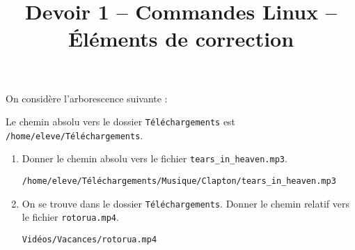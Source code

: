 \documentclass[a4paper,dvipsnames]{article}
\title{Devoir 1 -- Commandes Linux -- Éléments de correction}
\author{}
\date{}
\newenvironment{correction}{\color{blue}}{}
\begin{document}
\renewcommand{\contentsname}{}

\pagestyle{fancy}

\begin{tcolorbox}[colframe=blue!75, colback=blue!45, valign=center, height=1.5cm, top=5mm]
  \maketitle
\end{tcolorbox}


\vspace{1cm}

\thispagestyle{fancy}

\begin{exercice}{}{}
  On considère l'arborescence suivante :

  \bigskip


  \bigskip

  Le chemin absolu vers le dossier \texttt{Téléchargements} est \texttt{/home/eleve/Téléchargements}.

  \begin{enumerate}
    \item Donner le chemin absolu vers le fichier \texttt{tears_in_heaven.mp3}.

      \begin{correction}
	\begin{center}
	  \texttt{/home/eleve/Téléchargements/Musique/Clapton/tears_in_heaven.mp3} 
	\end{center}
      \end{correction}
      
    \item On se trouve dans le dossier \texttt{Téléchargements}. Donner le chemin relatif vers le fichier \texttt{rotorua.mp4}.

      \begin{correction}
	\begin{center}
	  \texttt{Vidéos/Vacances/rotorua.mp4}
	\end{center}
      \end{correction}
      

\end{enumerate}
\end{exercice}
\end{document}
